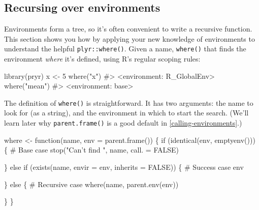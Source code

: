 \documentclass[oneside]{book}
\newenvironment{Shaded}{}{}
\newcommand{\KeywordTok} [1]{\textcolor[rgb]{0.00,0.44,0.13}{{#1}}}
\newcommand{\DataTypeTok}[1]{\textcolor[rgb]{0.56,0.13,0.00}{{#1}}}
\newcommand{\DecValTok}  [1]{\textcolor[rgb]{0.25,0.63,0.44}{{#1}}}
\newcommand{\StringTok}  [1]{\textcolor[rgb]{0.25,0.44,0.63}{{#1}}}
\newcommand{\CommentTok} [1]{\textcolor[rgb]{0.38,0.63,0.69}{{#1}}}
\newcommand{\OtherTok}   [1]{\textcolor[rgb]{0.00,0.44,0.13}{{#1}}}
\newcommand{\NormalTok}  [1]{{#1}}
\renewcommand{\hyperref}[2][???]{\autoref{#1}}
\begin{document}
\subsection{Recursing over
environments}\label{recursing-over-environments}

Environments form a tree, so it's often convenient to write a recursive
function. This section shows you how by applying your new knowledge of
environments to understand the helpful \texttt{plyr::where()}. Given a
name, \texttt{where()} that finds the environment \emph{where} it's
defined, using R's regular scoping rules:

\begin{Shaded}
\begin{Highlighting}[]
\KeywordTok{library}\NormalTok{(pryr)}
\NormalTok{x <-}\StringTok{ }\DecValTok{5}
\KeywordTok{where}\NormalTok{(}\StringTok{"x"}\NormalTok{)}
\CommentTok{#> <environment: R_GlobalEnv>}
\KeywordTok{where}\NormalTok{(}\StringTok{"mean"}\NormalTok{)}
\CommentTok{#> <environment: base>}
\end{Highlighting}
\end{Shaded}

The definition of \texttt{where()} is straightforward. It has two
arguments: the name to look for (as a string), and the environment in
which to start the search. (We'll learn later why
\texttt{parent.frame()} is a good default in
\hyperref[calling-environments]{calling environments}.)

\begin{Shaded}
\begin{Highlighting}[]
\NormalTok{where <-}\StringTok{ }\NormalTok{function(name, }\DataTypeTok{env =} \KeywordTok{parent.frame}\NormalTok{()) \{}
  \NormalTok{if (}\KeywordTok{identical}\NormalTok{(env, }\KeywordTok{emptyenv}\NormalTok{())) \{}
    \CommentTok{# Base case}
    \KeywordTok{stop}\NormalTok{(}\StringTok{"Can't find "}\NormalTok{, name, }\DataTypeTok{call. =} \OtherTok{FALSE}\NormalTok{)}
    
  \NormalTok{\} else if (}\KeywordTok{exists}\NormalTok{(name, }\DataTypeTok{envir =} \NormalTok{env, }\DataTypeTok{inherits =} \OtherTok{FALSE}\NormalTok{)) \{}
    \CommentTok{# Success case}
    \NormalTok{env}
    
  \NormalTok{\} else \{}
    \CommentTok{# Recursive case}
    \KeywordTok{where}\NormalTok{(name, }\KeywordTok{parent.env}\NormalTok{(env))}
    
  \NormalTok{\}}
\NormalTok{\}}
\end{Highlighting}
\end{Shaded}
\end{document}
